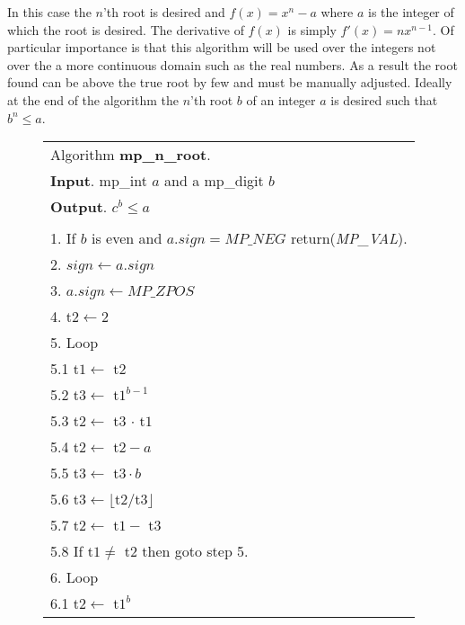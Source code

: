 \documentclass[b5paper]{book}
\begin{document}
In this case the $n$'th root is desired and $f(x) = x^n - a$ where $a$ is the integer of which the root is desired.  The derivative of $f(x)$ is 
simply $f'(x) = nx^{n - 1}$.  Of particular importance is that this algorithm will be used over the integers not over the a more continuous domain
such as the real numbers.  As a result the root found can be above the true root by few and must be manually adjusted.  Ideally at the end of the 
algorithm the $n$'th root $b$ of an integer $a$ is desired such that $b^n \le a$.  

\newpage\begin{figure}[!here]
\begin{small}
\begin{center}
\begin{tabular}{l}
\hline Algorithm \textbf{mp\_n\_root}. \\
\textbf{Input}.   mp\_int $a$ and a mp\_digit $b$ \\
\textbf{Output}.  $c^b \le a$ \\
\hline \\
1.  If $b$ is even and $a.sign = MP\_NEG$ return(\textit{MP\_VAL}). \\
2.  $sign \leftarrow a.sign$ \\
3.  $a.sign \leftarrow MP\_ZPOS$ \\
4.  t$2 \leftarrow 2$ \\
5.  Loop \\
\hspace{3mm}5.1  t$1 \leftarrow $ t$2$ \\
\hspace{3mm}5.2  t$3 \leftarrow $ t$1^{b - 1}$ \\
\hspace{3mm}5.3  t$2 \leftarrow $ t$3 $ $\cdot$ t$1$ \\
\hspace{3mm}5.4  t$2 \leftarrow $ t$2 - a$ \\
\hspace{3mm}5.5  t$3 \leftarrow $ t$3 \cdot b$ \\
\hspace{3mm}5.6  t$3 \leftarrow \lfloor $t$2 / $t$3 \rfloor$ \\
\hspace{3mm}5.7  t$2 \leftarrow $ t$1 - $ t$3$ \\
\hspace{3mm}5.8  If t$1 \ne $ t$2$ then goto step 5.  \\
6.  Loop \\
\hspace{3mm}6.1  t$2 \leftarrow $ t$1^b$ \\

\end{tabular}
\end{center}
\end{small}
\end{figure}
\end{document}
